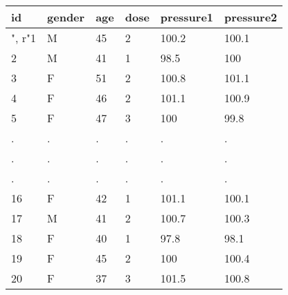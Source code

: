 \documentclass[preview]{standalone}
\begin{document}
\centering \begin{tabular}{llllll}
\hline id & gender & age & dose & pressure1 & pressure2 \\\hline",
r"1 & M & 45 & 2 & 100.2 & 100.1 \\
2 & M & 41 & 1 & 98.5 & 100 \\
3 & F & 51 & 2 & 100.8 & 101.1 \\
4 & F & 46 & 2 & 101.1 & 100.9 \\
5 & F & 47 & 3 & 100 & 99.8 \\
. & . & . & . & . & . \\
. & . & . & . & . & . \\
. & . & . & . & . & . \\
16 & F & 42 & 1 & 101.1 & 100.1 \\
17 & M & 41 & 2 & 100.7 & 100.3 \\
18 & F & 40 & 1 & 97.8 & 98.1 \\
19 & F & 45 & 2 & 100 & 100.4 \\
20 & F & 37 & 3 & 101.5 & 100.8 \\
\hline
\end{tabular}
\end{document}
